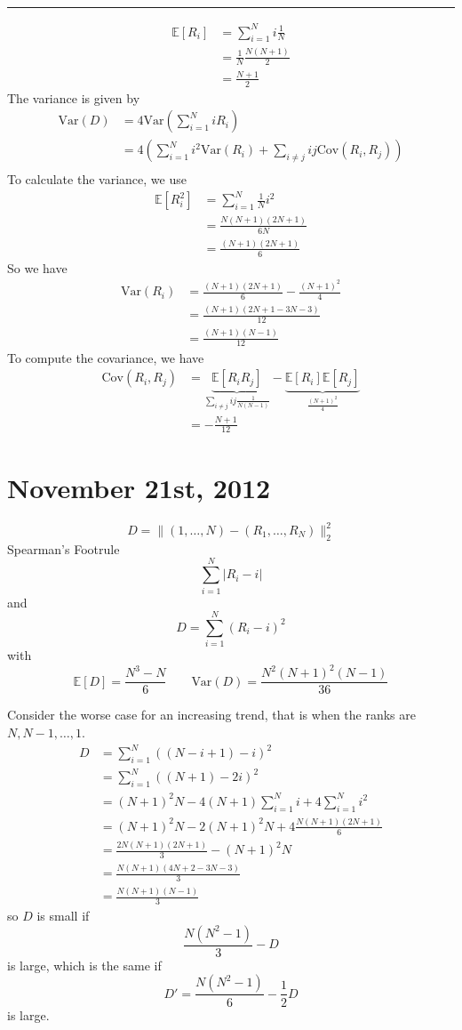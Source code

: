 \documentclass[a4paper,12pt]{amsart}
\newcommand{\sumiN}{\sum_{i=1}^N}
\newcommand{\Var}{\mbox{Var}}
\newcommand{\Cov}{\mbox{Cov}}
\newcommand{\E}[1]{\mathbb{E}\left[#1\right]}
\begin{document}
\bigskip
\hrule
\bigskip
\begin{align*}
\E{R_i} &= \sumiN i \frac{1}{N}\\
&= \frac{1}{N} \frac{N(N+1)}{2}\\
&= \frac{N+1}{2}
\end{align*}
The variance is given by
\begin{align*}
\Var(D) &= 4 \Var\left(\sumiN i R_i\right)\\
&= 4 \left(\sumiN i^2 \Var(R_i) + \sum_{i \neq j} ij \Cov(R_i,R_j)\right)\\
\end{align*}
To calculate the variance, we use
\begin{align*}
\E{R_i^2} &= \sumiN \frac{1}{N} i^2\\
&= \frac{N(N+1)(2N+1)}{6N}\\
&= \frac{(N+1)(2N+1)}{6}
\end{align*}
So we have
\begin{align*}
\Var(R_i) &= \frac{(N+1)(2N+1)}{6} - \frac{(N+1)^2}{4}\\
&= \frac{(N+1)(2N+1-3N-3)}{12}\\
&= \frac{(N+1)(N-1)}{12}
\end{align*}
To compute the covariance, we have
\begin{align*}
\Cov(R_i,R_j) &= \underbrace{\E{R_i R_j}}_{\sum_{i \neq j} ij\frac{1}{N(N-1)}} - \underbrace{\E{R_i}\E{R_j}}_{\frac{(N+1)^2}{4}}\\
&= -\frac{N+1}{12}
\end{align*}


\section{November 21st, 2012}
\[D = \|(1,\ldots,N) - (R_1, \ldots, R_N)\|^2_2\]
Spearman's Footrule\\
\[\sumiN |R_i -i|\]
and
\[D = \sumiN (R_i - i)^2\]
with
\[\E{D} = \frac{N^3-N}{6}\qquad \Var(D) = \frac{N^2(N+1)^2(N-1)}{36}\]

Consider the worse case for an increasing trend, that is when the ranks are $N, N-1, \ldots, 1$.
\begin{align*}
D &= \sumiN ((N-i + 1) - i)^2\\
&= \sumiN ((N+1) - 2i)^2\\
&= (N+1)^2 N - 4(N+1)\sumiN i + 4 \sumiN i^2\\
&= (N+1)^2 N - 2(N+1)^2 N + 4\frac{N(N+1)(2N+1)}{6}\\
&= \frac{2N(N+1)(2N+1)}{3} - (N+1)^2N\\
&= \frac{N(N+1)(4N+2 - 3N - 3)}{3}\\
&= \frac{N(N+1)(N-1)}{3}
\end{align*}
so $D$ is small if 
\[\frac{N(N^2-1)}{3} - D\]
is large, which is the same if
\[D'=\frac{N(N^2-1)}{6} - \frac{1}{2}D\]
is large.
\end{document}
